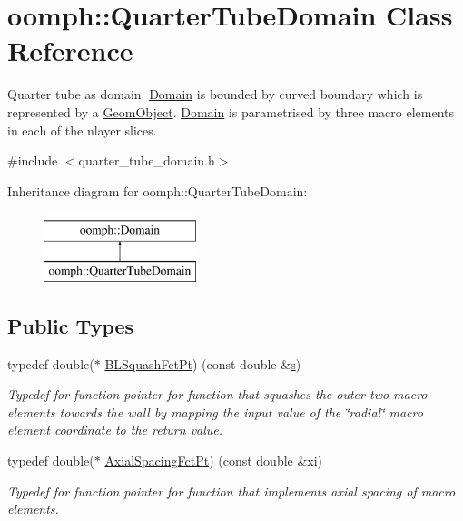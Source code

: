 \hypertarget{classoomph_1_1QuarterTubeDomain}{}\section{oomph\+:\+:Quarter\+Tube\+Domain Class Reference}
\label{classoomph_1_1QuarterTubeDomain}


Quarter tube as domain. \hyperlink{classoomph_1_1Domain}{Domain} is bounded by curved boundary which is represented by a \hyperlink{classoomph_1_1GeomObject}{Geom\+Object}. \hyperlink{classoomph_1_1Domain}{Domain} is parametrised by three macro elements in each of the nlayer slices.  




{\ttfamily \#include $<$quarter\+\_\+tube\+\_\+domain.\+h$>$}

Inheritance diagram for oomph\+:\+:Quarter\+Tube\+Domain\+:\begin{figure}[H]
\begin{center}
\leavevmode
\includegraphics[height=2.000000cm]{classoomph_1_1QuarterTubeDomain}
\end{center}
\end{figure}
\subsection*{Public Types}
\begin{DoxyCompactItemize}
\item 
typedef double($\ast$ \hyperlink{classoomph_1_1QuarterTubeDomain_a3d8c15c17d9912d8c519c028437c0b2c}{B\+L\+Squash\+Fct\+Pt}) (const double \&\hyperlink{cfortran_8h_ab7123126e4885ef647dd9c6e3807a21c}{s})
\begin{DoxyCompactList}\small\item\em Typedef for function pointer for function that squashes the outer two macro elements towards the wall by mapping the input value of the \char`\"{}radial\char`\"{} macro element coordinate to the return value. \end{DoxyCompactList}\item 
typedef double($\ast$ \hyperlink{classoomph_1_1QuarterTubeDomain_ae347af42a5dcb9b3b82c2247975b01db}{Axial\+Spacing\+Fct\+Pt}) (const double \&xi)
\begin{DoxyCompactList}\small\item\em Typedef for function pointer for function that implements axial spacing of macro elements. \end{DoxyCompactList}\end{DoxyCompactItemize}
